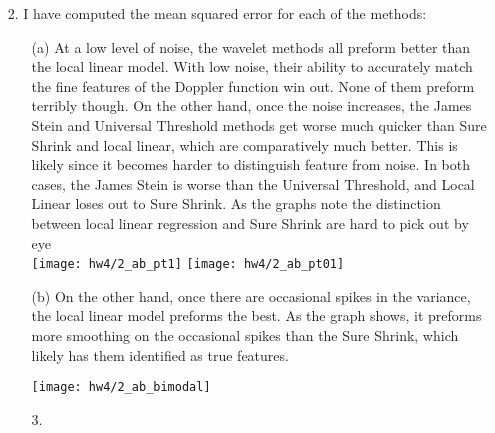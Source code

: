 \documentclass[11pt]{article}
\theoremstyle{definition}
\begin{document}
\begin{itemize}
\begin{itemize}
\begin{itemize}
\begin{itemize}
                        \end{itemize}
                \end{itemize}
        \end{itemize}
    \item[2.]
        I have computed the mean squared error for each of the methods:
        \FloatBarrier
         
        \FloatBarrier
        \begin{itemize}
            \item[(a)]
                At a low level of noise, the wavelet methods all preform better than the local linear model. With low noise, their ability to accurately match the fine features of the Doppler function win out. None of them preform terribly though. On the other hand, once the noise increases, the James Stein and Universal Threshold methods get worse much quicker than Sure Shrink and local linear, which are comparatively much better. This is likely since it becomes harder to distinguish feature from noise. In both cases, the James Stein is worse than the Universal Threshold, and Local Linear loses out to Sure Shrink. As the graphs note the distinction between local linear regression and Sure Shrink are hard to pick out by eye  \\
                \texttt{[image: hw4/2\_ab\_pt1]} 
                \texttt{[image: hw4/2\_ab\_pt01]} \\
            \item[(b)]
                On the other hand, once there are occasional spikes in the variance, the local linear model preforms the best. As the graph shows, it preforms more smoothing on the occasional spikes than the Sure Shrink, which likely has them identified as true features.
                \begin{center}
                    \texttt{[image: hw4/2\_ab\_bimodal]} 
                \end{center}
    \item[3.]
            
        \end{itemize}

        
\end{itemize}
\end{document}
